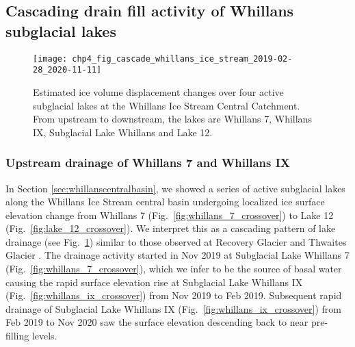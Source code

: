 

\subsection{Cascading drain fill activity of Whillans subglacial lakes} \label{sec:cascade}

\begin{figure}[htbp]
  \texttt{[image: chp4\_fig\_cascade\_whillans\_ice\_stream\_2019-02-28\_2020-11-11]}
  \caption[Ice Volume displacement over Whillans Ice Stream central catchment lakes]{
    Estimated ice volume displacement changes over four active subglacial lakes at the Whillans Ice Stream Central Catchment.
    From upstream to downstream, the lakes are Whillans 7, Whillans IX, Subglacial Lake Whillans and Lake 12.
  }
  \label{fig:cascade}
\end{figure}

\subsubsection{Upstream drainage of Whillans 7 and Whillans IX}

In Section \ref{sec:whillanscentralbasin}, we showed a series of active subglacial lakes along the Whillans Ice Stream central basin undergoing localized ice surface elevation change from Whillans 7 (Fig.~\ref{fig:whillans_7_crossover}) to Lake 12 (Fig.~\ref{fig:lake_12_crossover}).
We interpret this as a cascading pattern of lake drainage (see Fig.~\ref{fig:cascade}) similar to those observed at Recovery Glacier \citep{DowDynamicsActiveSubglacial2018} and Thwaites Glacier \citep{SmithConnectedsubglaciallake2017}. %
The drainage activity started in Nov 2019 at Subglacial Lake Whillans 7 (Fig.~\ref{fig:whillans_7_crossover}), which we infer to be the source of basal water causing the rapid surface elevation rise at Subglacial Lake Whillans IX (Fig.~\ref{fig:whillans_ix_crossover}) from Nov 2019 to Feb 2019.
Subsequent rapid drainage of Subglacial Lake Whillans IX (Fig.~\ref{fig:whillans_ix_crossover}) from Feb 2019 to Nov 2020 saw the surface elevation descending back to near pre-filling levels.

